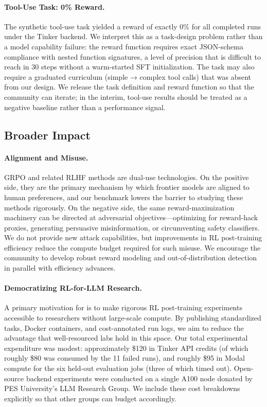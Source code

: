 \paragraph{Tool-Use Task: 0\% Reward.}
The synthetic tool-use task yielded a reward of exactly 0\% for all completed
runs under the Tinker backend. We interpret this as a task-design problem
rather than a model capability failure: the reward function requires exact
JSON-schema compliance with nested function signatures, a level of precision
that is difficult to reach in 30 steps without a warm-started SFT initialization.
The task may also require a graduated curriculum (simple → complex tool calls)
that was absent from our design. We release the task definition and reward
function so that the community can iterate; in the interim, tool-use results
should be treated as a negative baseline rather than a performance signal.

\subsection{Broader Impact}
\label{sec:impact}

\paragraph{Alignment and Misuse.}
GRPO and related RLHF methods are dual-use technologies. On the positive side,
they are the primary mechanism by which frontier models are aligned to human
preferences, and our benchmark lowers the barrier to studying these methods
rigorously. On the negative side, the same reward-maximization machinery can
be directed at adversarial objectives---optimizing for reward-hack proxies,
generating persuasive misinformation, or circumventing safety classifiers. We
do not provide new attack capabilities, but improvements in RL post-training
efficiency reduce the compute budget required for such misuse. We encourage
the community to develop robust reward modeling and out-of-distribution
detection in parallel with efficiency advances.

\paragraph{Democratizing RL-for-LLM Research.}
A primary motivation for \ours{} is to make rigorous RL post-training
experiments accessible to researchers without large-scale compute. By
publishing standardized tasks, Docker containers, and cost-annotated run
logs, we aim to reduce the advantage that well-resourced labs hold in this
space. Our total experimental expenditure was modest: approximately \$120 in
Tinker API credits (of which roughly \$80 was consumed by the 11 failed runs),
and roughly \$95 in Modal compute for the six held-out evaluation jobs
(three of which timed out). Open-source backend experiments were conducted on
a single A100 node donated by PES University's LLM Research Group. We include
these cost breakdowns explicitly so that other groups can budget accordingly.

